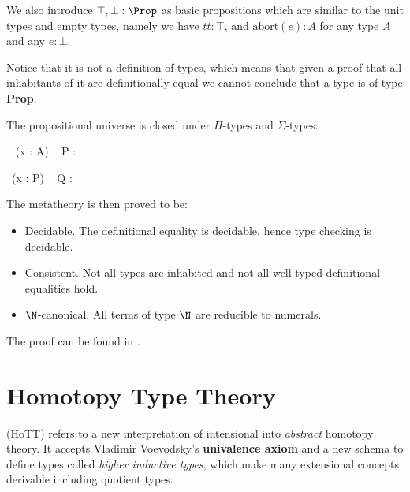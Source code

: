 
We also introduce $\top, \bot : \Prop$ as basic propositions which are similar to the unit types and empty types, namely we have $tt : \top$, and $\text{abort}(e) : A$ for any type $A$ and any $e : \bot$.

Notice that it is not a definition of types, which means that given a
proof that all inhabitants of it are definitionally equal we cannot
conclude that a type is of type \textbf{Prop}.

The propositional universe is closed under $\Pi$-types and $\Sigma$-types:

{\Gamma \vdash \Pi~ (x : A) ~ P : \Prop}


{\Gamma \vdash \Sigma ~(x : P) ~ Q : \Prop}



The metatheory is then proved to be:

\begin{itemize}
\item Decidable. The definitional equality is decidable, hence type checking is decidable.

\item Consistent. Not all types are inhabited and not all well typed definitional equalities hold. 

\item $\N$-canonical. All terms of type $\N$ are reducible to numerals.
\end{itemize}

The proof can be found in \cite{alti:lics99}.


\section{Homotopy Type Theory}\label{hott}

\hott (HoTT) refers to a new interpretation of intensional \mltt
into \emph{abstract} homotopy theory.
It accepts Vladimir Voevodsky's \textbf{univalence axiom} and a new schema to define types called \emph{higher inductive types}, which make many extensional concepts derivable including quotient types.



